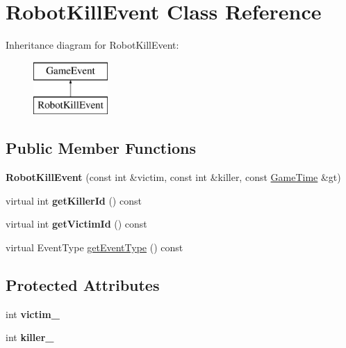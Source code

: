 \hypertarget{class_robot_kill_event}{}\section{Robot\+Kill\+Event Class Reference}
\label{class_robot_kill_event}
Inheritance diagram for Robot\+Kill\+Event\+:\begin{figure}[H]
\begin{center}
\leavevmode
\includegraphics[height=2.000000cm]{class_robot_kill_event}
\end{center}
\end{figure}
\subsection*{Public Member Functions}
\begin{DoxyCompactItemize}
\item 
{\bfseries Robot\+Kill\+Event} (const int \&victim, const int \&killer, const \hyperlink{class_game_time}{Game\+Time} \&gt)\hypertarget{class_robot_kill_event_a5c34eb1e34b7f448d1efa796ad21db2c}{}\label{class_robot_kill_event_a5c34eb1e34b7f448d1efa796ad21db2c}

\item 
virtual int {\bfseries get\+Killer\+Id} () const \hypertarget{class_robot_kill_event_af8bc78825106fc5c6d118b5cef5074fd}{}\label{class_robot_kill_event_af8bc78825106fc5c6d118b5cef5074fd}

\item 
virtual int {\bfseries get\+Victim\+Id} () const \hypertarget{class_robot_kill_event_a39fd39dd967e09871abf90bc09ace698}{}\label{class_robot_kill_event_a39fd39dd967e09871abf90bc09ace698}

\item 
virtual Event\+Type \hyperlink{class_robot_kill_event_a8a17b10570a6a64ff1d3f57487aa8979}{get\+Event\+Type} () const 
\end{DoxyCompactItemize}
\subsection*{Protected Attributes}
\begin{DoxyCompactItemize}
\item 
int {\bfseries victim\+\_\+}\hypertarget{class_robot_kill_event_a6fc0ce7bc46508406894f956d9f50b67}{}\label{class_robot_kill_event_a6fc0ce7bc46508406894f956d9f50b67}

\item 
int {\bfseries killer\+\_\+}\hypertarget{class_robot_kill_event_ab32eb0d5383ba748ab0be1c2a69ae2fa}{}\label{class_robot_kill_event_ab32eb0d5383ba748ab0be1c2a69ae2fa}

\end{DoxyCompactItemize}
